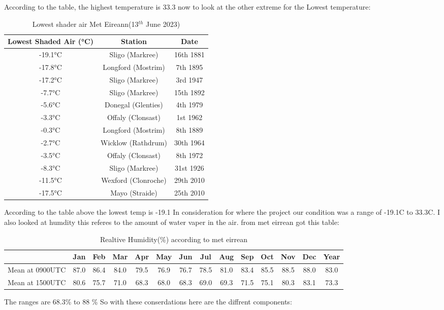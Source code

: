 According to the table, the highest temperature is 33.3  
now to look at the  other  extreme for the Lowest temperature:
	\begin{table}[h!]
		\begin{tabular}{ | c | c | c | }
		\hline
		Lowest Shaded Air (°C) & Station & Date \\ \hline
		-19.1°C & Sligo (Markree) & 16th 1881 \\ \hline
		-17.8°C & Longford (Mostrim) & 7th 1895 \\ \hline
		-17.2°C & Sligo (Markree) & 3rd 1947 \\ \hline
		-7.7°C & Sligo (Markree) & 15th 1892 \\ \hline
		-5.6°C & Donegal (Glenties) & 4th 1979 \\ \hline
		-3.3°C & Offaly (Clonsast) & 1st 1962 \\ \hline
		-0.3°C & Longford (Mostrim) & 8th 1889 \\ \hline
		-2.7°C & Wicklow (Rathdrum) & 30th 1964 \\ \hline
		-3.5°C & Offaly (Clonsast) & 8th 1972 \\ \hline
		-8.3°C & Sligo (Markree) & 31st 1926 \\ \hline
		-11.5°C & Wexford (Clonroche) & 29th 2010 \\ \hline
		-17.5°C & Mayo (Straide) & 25th 2010 \\ \hline
		\end{tabular}
	\caption{Lowest shader air Met Eireann(13$^{th}$ June 2023)}
	\label{Lowest shader air Met eirrean}	
	\end{table}

According to the table above the lowest temp is -19.1
In consideration for where the project our condition was a range of -19.1\textdegree C to 33.3\textdegree C.
\newpage
I also  looked  at  humdity this  referes to the amount of water vaper in the air. from  met eirrean \cite{eirrean2}
got this  table:
\begin{table}[h!]
	\begin{tabular}{|c|c|c|c|c|c|c|c|c|c|c|c|c|c|}
		\hline
		\space & Jan & Feb & Mar & Apr & May & Jun & Jul & Aug & Sep & Oct & Nov & Dec & Year \\
		\hline
		Mean at 0900UTC &87.0 &86.4&84.0&79.5&76.9&76.7&78.5&81.0&83.4&85.5&88.5&88.0&83.0 \\
		Mean at 1500UTC &80.6&75.7&71.0&68.3&68.0&68.3&69.0&69.3&71.5&75.1&80.3&83.1&73.3\\
		\hline
	\end{tabular}
	\caption{Realtive Humidity(\%) according to met eirrean}
	\label{Realtive Humidity according to met eirrean}
\end{table}
The ranges are 68.3\% to 88 \% So with these  conserdations here are  the  diffrent components:

